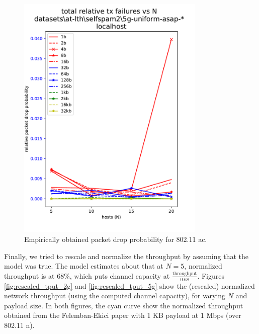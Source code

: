 \begin{figure}[tbp]
  \centering
  \includegraphics[width=0.8\textwidth]{images/relative_tx_fail_5g.pdf}
  \caption{Empirically obtained packet drop probability for 802.11 ac.}
  \label{fig:relative_txfail_5g}
\end{figure}

Finally, we tried to rescale and normalize the throughput by assuming that the
model was true. The model estimates about that at $N = 5$, normalized
throughput is at $68\%$, which puts channel capacity at
$\frac{\text{throughput}}{0.68}$. Figures \ref{fig:rescaled_tput_2g} and
\ref{fig:rescaled_tput_5g} show the (rescaled) normalized network throughput
(using the computed channel capacity), for varying $N$ and payload size. In
both figures, the cyan curve show the normalized throughput obtained from the
Felemban-Ekici paper with 1 KB payload at 1 Mbps (over 802.11 n).

